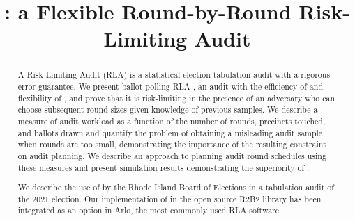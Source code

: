 \date{}

\title{\Large \bf \Providence: a Flexible Round-by-Round Risk-Limiting Audit}
\maketitle

\begin{abstract}
A Risk-Limiting Audit (RLA) is a statistical election tabulation audit with a rigorous error guarantee. We present ballot polling RLA \Providence, an audit with the efficiency of \Minerva and flexibility of \BRAVO, and prove that it is risk-limiting in the presence of an adversary who can choose subsequent round sizes given knowledge of previous samples. We describe a measure of audit workload as a function of the number of rounds, precincts touched, and ballots drawn and quantify the problem of obtaining a misleading audit sample when rounds are too small, demonstrating the importance of the resulting constraint on audit planning. We describe an approach to planning audit round schedules using these measures and present simulation results demonstrating the superiority of \Providence. 

We describe the use of \Providence by the Rhode Island Board of Elections in a tabulation audit of the 2021 election. 
Our implementation of \Providence 
in the open source R2B2 library has been integrated as an option in Arlo, the most commonly used RLA software.

\end{abstract}
%
%

